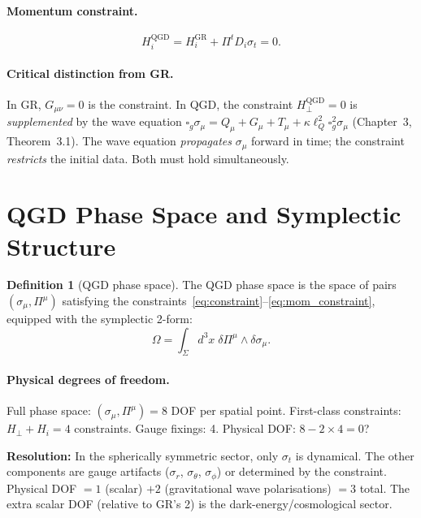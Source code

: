 \documentclass[11pt,a4paper]{article}
\theoremstyle{plain}
\theoremstyle{definition}
\newtheorem{definition}[theorem]{Definition}
\theoremstyle{remark}
\newcommand{\lQ}{\ell_Q}
\newcommand{\boxg}{\square_g}
\newcommand{\Hperp}{H_\perp}
\newcommand{\Hi}{H_i}
\newcommand{\sigt}{\sigma_t}
\begin{document}
\paragraph{Momentum constraint.}
\begin{equation}
  \Hi^{\mathrm{QGD}} = \Hi^{\mathrm{GR}} + \Pi^t D_i\sigt = 0.
  \label{eq:mom_constraint}
\end{equation}

\paragraph{Critical distinction from GR.}
In GR, $G_{\mu\nu} = 0$ is the constraint.  In QGD, the constraint $\Hperp^{\mathrm{QGD}}=0$
is \emph{supplemented} by the wave equation
$\boxg\sigma_\mu = Q_\mu + G_\mu + T_\mu + \kappa\lQ^2\boxg^2\sigma_\mu$
(Chapter~3, Theorem~3.1).  The wave equation \emph{propagates} $\sigma_\mu$
forward in time; the constraint \emph{restricts} the initial data.
Both must hold simultaneously.

\section{QGD Phase Space and Symplectic Structure}
\label{sec:phase_space}

\begin{definition}[QGD phase space]
The QGD phase space is the space of pairs $(\sigma_\mu, \Pi^\mu)$
satisfying the constraints~\eqref{eq:constraint}--\eqref{eq:mom_constraint},
equipped with the symplectic 2-form:
\begin{equation}
  \Omega = \int_\Sigma d^3x\; \delta\Pi^\mu \wedge \delta\sigma_\mu.
  \label{eq:symplectic}
\end{equation}
\end{definition}

\paragraph{Physical degrees of freedom.}
Full phase space: $(\sigma_\mu, \Pi^\mu) = 8$ DOF per spatial point.
First-class constraints: $\Hperp + \Hi = 4$ constraints.
Gauge fixings: 4.
Physical DOF: $8 - 2\times4 = 0$?

\textbf{Resolution:} In the spherically symmetric sector, only $\sigt$ is
dynamical.  The other components are gauge artifacts ($\sigma_r$, $\sigma_\theta$,
$\sigma_\phi$) or determined by the constraint.  Physical DOF $= 1$ (scalar)
$+ 2$ (gravitational wave polarisations) $= 3$ total.
The extra scalar DOF (relative to GR's 2) is the dark-energy/cosmological sector.
\end{document}
